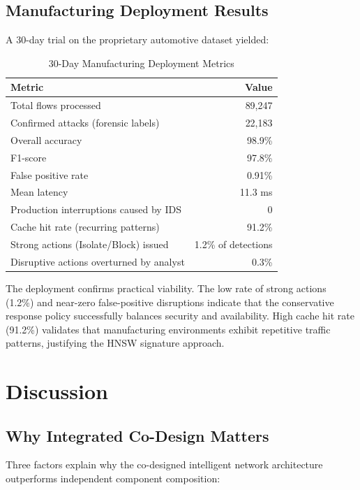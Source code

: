 \documentclass[preprint,12pt]{elsarticle}
\begin{document}
\subsection{Manufacturing Deployment Results}

A 30-day trial on the proprietary automotive dataset yielded:

\begin{table}[!t]
\caption{30-Day Manufacturing Deployment Metrics}
\label{tab:deployment}
\centering
\small
\begin{tabular}{@{}lr@{}}
\toprule
\textbf{Metric} & \textbf{Value} \\
\midrule
Total flows processed & 89,247 \\
Confirmed attacks (forensic labels) & 22,183 \\
Overall accuracy & 98.9\% \\
F1-score & 97.8\% \\
False positive rate & 0.91\% \\
Mean latency & 11.3 ms \\
Production interruptions caused by IDS & 0 \\
Cache hit rate (recurring patterns) & 91.2\% \\
Strong actions (Isolate/Block) issued & 1.2\% of detections \\
Disruptive actions overturned by analyst & 0.3\% \\
\bottomrule
\end{tabular}
\end{table}

The deployment confirms practical viability. The low rate of strong actions (1.2\%) and near-zero false-positive disruptions indicate that the conservative response policy successfully balances security and availability. High cache hit rate (91.2\%) validates that manufacturing environments exhibit repetitive traffic patterns, justifying the HNSW signature approach.

\section{Discussion}
\label{sec:discussion}

\subsection{Why Integrated Co-Design Matters}

Three factors explain why the co-designed intelligent network architecture outperforms independent component composition:
\end{document}
